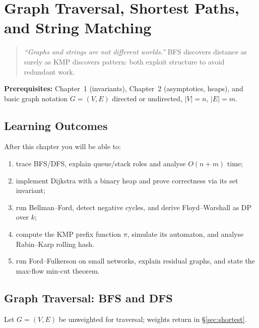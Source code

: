 \chapter{Graph Traversal, Shortest Paths, and String Matching}
\label{ch:graph-string}

\begin{quote}
\emph{``Graphs and strings are not different worlds.''} BFS discovers distance
as surely as KMP discovers pattern: both exploit structure to avoid redundant work.
\end{quote}

\noindent\textbf{Prerequisites:} Chapter~1 (invariants), Chapter~2 (asymptotics, heaps), and basic graph notation $G=(V,E)$ directed or undirected, $|V|=n$, $|E|=m$.

\section*{Learning Outcomes}
After this chapter you will be able to:
\begin{enumerate}[label=(L\arabic*)]
    \item trace BFS/DFS, explain queue/stack roles and analyse $O(n+m)$ time;
    \item implement Dijkstra with a binary heap and prove correctness via its set invariant;
    \item run Bellman--Ford, detect negative cycles, and derive Floyd--Warshall as DP over $k$;
    \item compute the KMP prefix function $\pi$, simulate its automaton, and analyse Rabin--Karp rolling hash.
    \item run Ford--Fulkerson on small networks, explain residual graphs, and state the max-flow min-cut theorem.
\end{enumerate}

\section{Graph Traversal: BFS and DFS}
\label{sec:bfs-dfs}

Let $G=(V,E)$ be unweighted for traversal; weights return in \S\ref{sec:shortest}.
